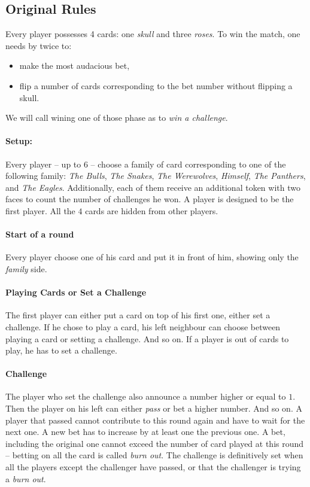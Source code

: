 \documentclass[]{article}       %
\begin{document}
\subsection{Original Rules}
Every player possesses 4 cards: one \emph{skull} and three \emph{roses}.
To win the match, one needs by twice to:
\begin{itemize}
\item make the most audacious bet,
\item flip a number of cards corresponding to the bet number without flipping a skull.
\end{itemize}
We will call wining one of those phase as to \emph{win a challenge}.
\paragraph{Setup:}
Every player -- up to $6$ -- choose a family of card corresponding to one of the following family: 
\emph{The Bulls}, \emph{The Snakes}, \emph{The Werewolves}, \emph{Himself}, \emph{The Panthers}, and \emph{The Eagles}.
Additionally, each of them receive an additional token with two faces to count the number of challenges he won. A player is designed to be the first player.
All the $4$ cards are hidden from other players.

\paragraph{Start of a round}
Every player choose one of his card and put it in front of him, showing only the \emph{family} side.

\paragraph{Playing Cards or Set a Challenge}
The first player can either put a card on top of his first one, either set a challenge. If he chose to play a card, his left neighbour can choose between playing a card or setting a challenge. And so on. If a player is out of cards to play, he has to set a challenge.

\paragraph{Challenge}
The player who set the challenge also announce a number higher or equal to $1$. Then the player on his left can either \emph{pass} or bet a higher number. And so on.
A player that passed cannot contribute to this round again and have to wait for the next one. A new bet has to increase by at least one the previous one. A bet, including the original one cannot exceed the number of card played at this round -- betting on all the card is called \emph{burn out}.
The challenge is definitively set when all the players except the challenger have passed, or that the challenger is trying a \emph{burn out}.
\end{document}
